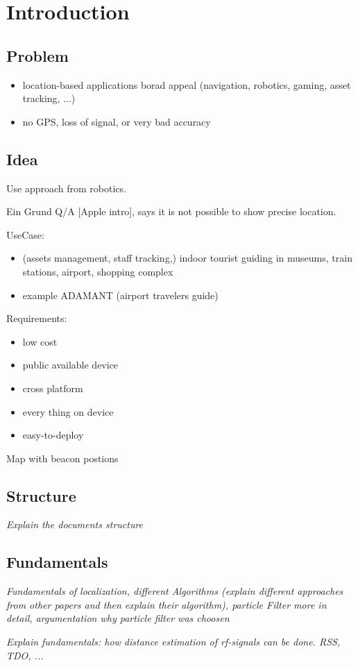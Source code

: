 \chapter{Introduction} \label{chap:intro}

\section{Problem}
\begin{itemize}
\item location-based applications borad appeal (navigation, robotics, gaming, asset tracking, ...)
\item no GPS, loss of signal, or very bad accuracy
\end{itemize}

\section{Idea}

Use approach from robotics.

Ein Grund Q/A [Apple intro], says it is not possible to show precise location.

UseCase:
\begin{itemize}
  \item (assets management, staff tracking,) indoor tourist guiding in museums, train stations, airport, shopping complex \cite{wang_2013}
  \item example ADAMANT (airport travelers guide) \cite{wang_2013}
\end{itemize}

Requirements:
\begin{itemize}
\item low cost
\item public available device
\item cross platform
\item every thing on device \cite{wang_2013}
\item easy-to-deploy \cite{wang_2013}
\end{itemize}

Map with beacon postions

\section{Structure}
\textit{Explain the documents structure}


\section{Fundamentals}
\textit{Fundamentals of localization, different Algorithms (explain different approaches from other papers and then explain their algorithm), particle Filter more in detail, argumentation why particle filter was choosen}


\textit{Explain fundamentals: how distance estimation of rf-signals can be done. RSS, TDO, ...}

